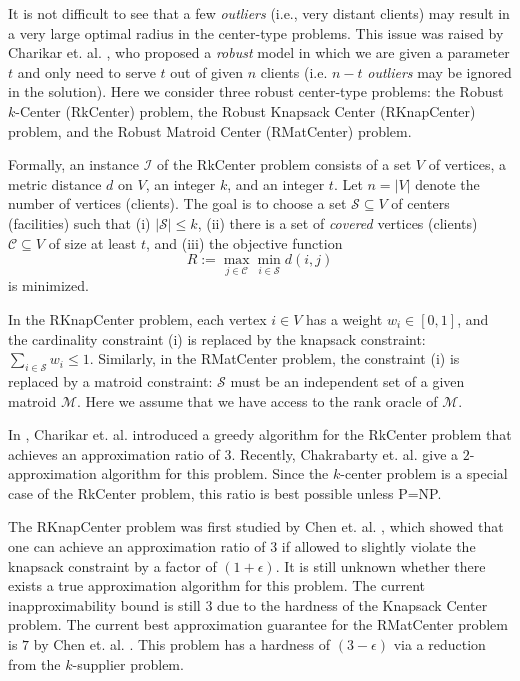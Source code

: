 \documentclass[a4paper,11pt]{article}
\newcommand{\C}{\mathcal{C}}
\renewcommand{\S}{\mathcal{S}}
\newcommand{\I}{\mathcal{I}}
\newcommand{\M}{\mathcal{M}}
\begin{document}
It is not difficult to see that a few \emph{outliers} (i.e., very distant clients) may result in a very large optimal radius in the center-type problems. This issue was raised by Charikar et. al. \cite{charikar_robustkc}, who proposed a \emph{robust} model in which we are given a parameter $t$ and only need to serve $t$ out of given $n$ clients (i.e. $n-t$ \emph{outliers} may be ignored in the solution). Here we consider three robust center-type problems: the Robust $k$-Center (\textsf{RkCenter}) problem, the Robust Knapsack Center (\textsf{RKnapCenter}) problem, and the Robust Matroid Center (\textsf{RMatCenter}) problem.


Formally, an instance $\I$ of the \textsf{RkCenter} problem consists of a set $V$ of vertices, a metric distance $d$ on $V$, an integer $k$, and an integer $t$. Let $n = |V|$ denote the number of vertices (clients). The goal is to choose a set $\S \subseteq V$ of centers (facilities) such that (i) $|\S| \leq k$, (ii) there is a set of \emph{covered} vertices (clients) $\C \subseteq V$ of size at least $t$, and (iii) the objective function
$$ R := \max_{j \in \C} \min_{i \in \S} d(i,j)$$
is minimized. 

In the \textsf{RKnapCenter} problem, each vertex $i \in V$ has a weight $w_i \in [0,1]$, and the cardinality constraint (i) is replaced by the knapsack constraint: $\sum_{i \in \S}w_i \leq 1$. Similarly, in the \textsf{RMatCenter} problem, the constraint (i) is replaced by a matroid constraint: $\S$ must be an independent set of a given matroid $\M$. Here we assume that we have access to the rank oracle of $\M$.

In \cite{charikar_robustkc}, Charikar et. al. introduced a greedy algorithm for the \textsf{RkCenter} problem that achieves an approximation ratio of $3$. Recently, Chakrabarty et. al. \cite{chakrabarty_et_al} give a $2$-approximation algorithm for this problem. Since the $k$-center problem is a special case of the \textsf{RkCenter} problem, this ratio is best possible unless P=NP.


The \textsf{RKnapCenter} problem was first studied by Chen et. al. \cite{jianli_kc}, which showed that one can achieve an approximation ratio of $3$ if allowed to slightly violate the knapsack constraint by a factor of $(1+\epsilon)$. It is still unknown whether there exists a true approximation algorithm for this problem. The current inapproximability bound is still $3$ due to the hardness of the Knapsack Center problem. The current best approximation guarantee for the \textsf{RMatCenter} problem is $7$ by Chen et. al. \cite{jianli_kc}. This problem has a hardness of $(3-\epsilon)$ via a reduction from the $k$-supplier problem. 
\end{document}

